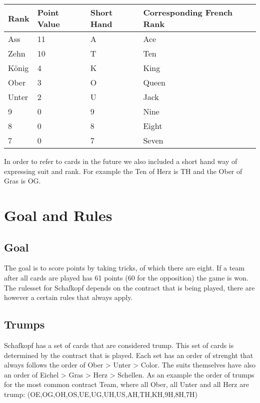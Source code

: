 \begin{table}[]
    \begin{tabular}{llll}
        \toprule
        Rank  & Point Value & Short Hand & Corresponding French Rank \\
        \midrule
        Ass   & 11          & A          & Ace                       \\
        Zehn  & 10          & T          & Ten                       \\
        König & 4           & K          & King                      \\
        Ober  & 3           & O          & Queen                     \\
        Unter & 2           & U          & Jack                      \\
        9     & 0           & 9          & Nine                      \\
        8     & 0           & 8          & Eight                     \\
        7     & 0           & 7          & Seven                     \\
        \bottomrule
    \end{tabular}\label{tab:table}
\end{table}
In order to refer to cards in the future we also included a short hand way of expressing suit and rank.
For example the Ten of Herz is TH and the Ober of Gras is OG.


\section{Goal and Rules}

\subsection{Goal}
The goal is to score points by taking tricks, of which there are eight.
If a team after all cards are played has 61 points (60 for the opposition) the game is won.
The rulesset for Schafkopf depends on the contract that is being played, there are however a certain rules that
always apply.

\subsection{Trumps}
Schafkopf has a set of cards that are considered trump.
This set of cards is determined by the contract that is played.
Each set has an order of strenght that always follows the order of Ober > Unter > Color.
The suits themselves have also an order of Eichel > Gras > Herz > Schellen.
As an example the order of trumps for the most common contract Team, where all Ober, all Unter and all Herz are trump:
(OE,OG,OH,OS,UE,UG,UH,US,AH,TH,KH,9H,8H,7H)

